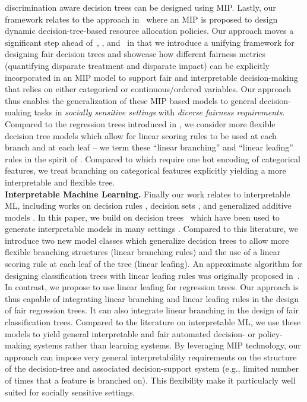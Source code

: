 \documentclass[letterpaper]{article} %
\theoremstyle{definition}
\newcommand{\1}{\ensuremath{{\rm e}}} %
\begin{document}
discrimination aware decision trees can be designed using MIP. Lastly, our framework relates to the approach in~\cite{Azizi2018_CPAIOR} where an MIP is proposed to design dynamic decision-tree-based resource allocation policies. Our approach moves a significant step ahead of~\cite{Bertsimas2017}, \cite{verwer2017}, and~\cite{Azizi2018_CPAIOR} in that we introduce a unifying framework for designing fair decision trees and showcase how different fairness metrics (quantifying disparate treatment and disparate impact) can be explicitly incorporated in an MIP model to support fair and interpretable decision-making that relies on either categorical or continuous/ordered variables. Our approach thus enables the generalization of these MIP based models to {general decision-making tasks} in \emph{socially sensitive settings} with \emph{diverse fairness requirements}. Compared to the regression trees introduced in \cite{verwer2017}, we consider more flexible decision tree models which allow for linear scoring rules to be used at each branch and at each leaf -- we term these ``linear branching'' and ``linear leafing'' rules in the spirit of \cite{Azizi2018_CPAIOR}. Compared to \cite{Bertsimas2017,verwer2017} which require one hot encoding of categorical features, we treat branching on categorical features explicitly yielding a more interpretable and flexible tree. \\ 
%
\textbf{Interpretable Machine Learning.} Finally our work relates to interpretable ML, including works on decision rules \cite{wangBayesian2017,letham2015interpretable}, decision sets \cite{lakkaraju2016interpretable}, and generalized additive models \cite{lou2013accurate}. In this paper, we build on decision trees~\cite{breiman1984classification} which have been used to generate interpretable models in many settings \cite{valdes2016mediboost,huang2007iptree,che2016interpretable}. Compared to this literature, we introduce two new model classes which generalize decision trees to allow more flexible branching structures (linear branching rules) and the use of a linear scoring rule at each leaf of the tree (linear leafing). An approximate algorithm for designing classification trees with linear leafing rules was originally proposed in~\cite{Frank1998}. In contrast, we propose to use linear leafing for regression trees. Our approach is thus capable of integrating linear branching and linear leafing rules in the design of fair regression trees. It can also integrate linear branching in the design of fair classification trees. Compared to the literature on interpretable ML, we use these models to yield general interpretable and fair automated decision- or policy-making systems rather than learning systems. By leveraging MIP technology, our approach can impose very general interpretability requirements on the structure of the decision-tree and associated decision-support system (e.g., limited number of times that a feature is branched on). This flexibility make it particularly well suited for socially sensitive settings.
\end{document}

